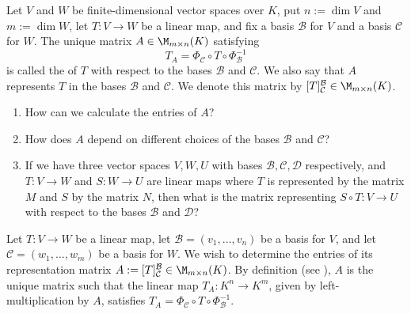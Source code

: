 \begin{definition*}
\label{def:representation_matrix}
Let $V$ and $W$ be finite-di\-men\-sional vector spaces over $K$, put $n := \dim V$ and $m := \dim W$, let $T: V \to W$ be a linear map, and fix a basis $\mathcal{B}$ for $V$ and a basis $\mathcal{C}$ for $W$. The unique matrix $A \in \M_{m \times n}(K)$ satisfying
\[
T_A = \Phi_{\mathcal{C}} \circ T \circ \Phi_{\mathcal{B}}^{-1}
\]
is called the  of $T$ with respect to the bases $\mathcal{B}$ and $\mathcal{C}$. We also say that $A$ represents $T$ in the bases $\mathcal{B}$ and $\mathcal{C}$. We denote this matrix by $[T]_{\mathcal{C}}^{\mathcal{B}} \in \M_{m \times n}(K)$.
\end{definition*}

\begin{question}
\begin{enumerate}
    \item How can we calculate the entries of $A$?
    \item How does $A$ depend on different choices of the bases $\mathcal{B}$ and $\mathcal{C}$?
    \item If we have three vector spaces $V, W, U$ with bases $\mathcal{B}, \mathcal{C}, \mathcal{D}$ respectively, and $T: V \to W$ and $S: W \to U$ are linear maps where $T$ is represented by the matrix $M$ and $S$ by the matrix $N$, then what is the matrix representing $S \circ T: V \to U$ with respect to the bases $\mathcal{B}$ and $\mathcal{D}$?
\end{enumerate}
\end{question}

Let $T: V \to W$ be a linear map, let $\mathcal{B} = (v_1, \dots, v_n)$ be a basis for $V$, and let $\mathcal{C} = (w_1, \dots, w_m)$ be a basis for $W$. We wish to determine the entries of its representation matrix $A := [T]_{\mathcal{C}}^{\mathcal{B}} \in \M_{m \times n}(K)$. By definition (see ), $A$ is the unique matrix such that the linear map $T_A: K^n \to K^m$, given by left-multiplication by $A$, satisfies $T_A = \Phi_{\mathcal{C}} \circ T \circ \Phi_{\mathcal{B}}^{-1}$.

